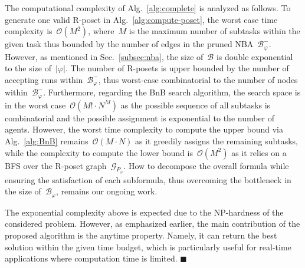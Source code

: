 The computational complexity of Alg.~\ref{alg:complete}
is analyzed as follows. To generate one valid R-poset in Alg.~\ref{alg:compute-poset},
the worst case time complexity is~$\mathcal{O}(M^2)$, where~$M$ is the maximum
number of subtasks within the given task thus bounded by the number of edges in the
pruned NBA~$\mathcal{B}^-_{\varphi}$.
However, as mentioned in Sec.~\ref{subsec:nba},
the size of~$\mathcal{B}$ is double exponential to the size of~$|\varphi|$.
The number of R-posets is upper bounded by the number of accepting runs
within~$\mathcal{B}^-_{\varphi}$, thus worst-case combinatorial to
the number of nodes within~$\mathcal{B}^-_{\varphi}$.
Furthermore, regarding the BnB search algorithm, the search space is in the worst
case~$\mathcal{O}(M!\cdot N^M)$ as the possible sequence of all subtasks
is combinatorial and the possible assignment is exponential to the
number of agents.
However, the worst time complexity to compute the upper bound via Alg.~\ref{alg:BnB}
remains~$\mathcal{O}(M\cdot N)$ as it greedily assigns the remaining subtasks,
while the complexity to compute the lower bound is~$\mathcal{O}(M^2)$ as it relies on a BFS over
the R-poset graph~$\mathcal{G}_{P_\varphi}$.
How to decompose the overall formula while ensuring
the satisfaction of each subformula, thus overcoming the bottleneck
in the size of~$\mathcal{B}_{\varphi}$, remains our ongoing work.

\begin{remark}\label{remark:anytime}
The exponential complexity above is expected due to the NP-hardness of the considered problem.
However, as emphasized earlier, the main contribution of the proposed algorithm
is the anytime property.
Namely, it can return the best solution within the given time budget,
which is particularly useful for real-time applications where computation time is limited.
\hfill  $\blacksquare$
\end{remark}
